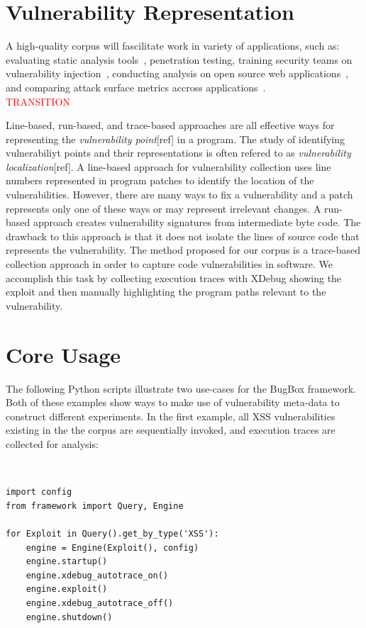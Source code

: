 \documentclass[letterpaper,twocolumn,10pt]{article}
\begin{document}
\section{Vulnerability Representation}

A high-quality corpus will fascilitate work in variety of applications, such as: evaluating static analysis tools~\cite{Zitser:2004:TSA:1041685.1029911}, penetration testing, training security teams on vulnerability injection~\cite{4725309}, conducting analysis on open source web applications~\cite{DBLP:journals/ese/HuynhM10}, and comparing attack surface metrics accross applications~\cite{Stuckman:2012:CAA:2372225.2372229}.\\
\textcolor{red}{ TRANSITION }
 
Line-based, run-based, and trace-based approaches are all effective ways for representing the \emph{vulnerability point}[ref] in a program.  The study of identifying vulnerabiliyt points and their representations is often refered to as \emph{vulnerability localization}[ref].  A line-based\cite{4630094} approach for vulnerability collection uses line numbers represented in program patches to identify the location of the vulnerabilities.  However, there are many ways to fix a vulnerability and a patch represents only one of these ways or may represent irrelevant changes.  A run-based\cite{Song:2008:BNA:1496255.1496257} approach creates vulnerability signatures from intermediate byte code.  The drawback to this approach is that it does not isolate the lines of source code that represents the vulnerability.  The method proposed for our corpus is a trace-based collection approach in order to capture code vulnerabilities in software.  We accomplish this task by collecting execution traces with XDebug showing the exploit and then manually highlighting the program paths relevant to the vulnerability.

\section{Core Usage}

The following Python scripts illustrate two use-cases for the BugBox framework. Both of these examples show ways to make use of vulnerability meta-data to construct different experiments. In the first example, all XSS vulnerabilities existing in the the corpus are sequentially invoked, and execution traces are collected for analysis:

  {\tt \footnotesize
\begin{verbatim}
import config
from framework import Query, Engine

for Exploit in Query().get_by_type('XSS'):
    engine = Engine(Exploit(), config)
    engine.startup()
    engine.xdebug_autotrace_on()
    engine.exploit()
    engine.xdebug_autotrace_off()
    engine.shutdown()
\end{verbatim}
}
\end{document}
